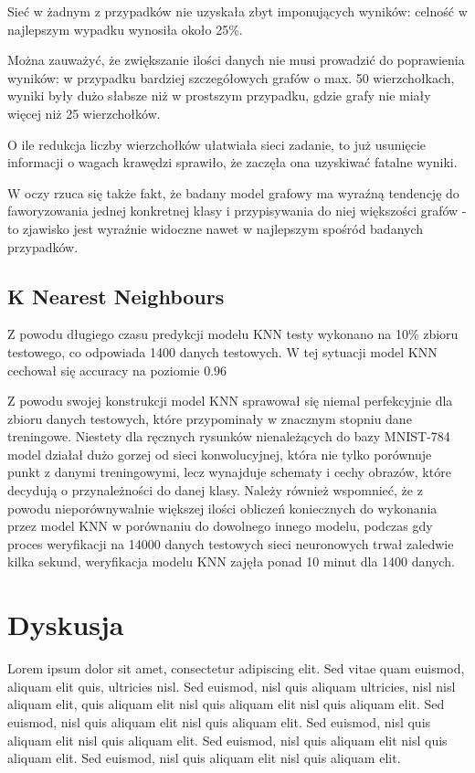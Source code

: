 \documentclass{article}
\begin{document}
Sieć w żadnym z przypadków nie uzyskała zbyt imponujących 
wyników: celność w najlepszym wypadku wynosiła około 25\%. 

Można zauważyć, że zwiększanie ilości danych nie musi 
prowadzić do poprawienia wyników: w przypadku bardziej 
szczegółowych grafów o max. 50 wierzchołkach, wyniki były 
dużo słabsze niż w prostszym przypadku, gdzie grafy nie 
miały więcej niż 25 wierzchołków.

O ile redukcja liczby wierzchołków ułatwiała sieci zadanie, 
to już usunięcie informacji o wagach krawędzi sprawiło, 
że zaczęła ona uzyskiwać fatalne wyniki.

W oczy rzuca się także fakt, że badany model grafowy ma 
wyraźną tendencję do faworyzowania jednej konkretnej klasy 
i przypisywania do niej większości grafów - to zjawisko jest 
wyraźnie widoczne nawet w najlepszym spośród badanych przypadków.

\subsection{K Nearest Neighbours}

Z powodu długiego czasu predykcji modelu KNN testy wykonano na 10\% zbioru 
testowego, co odpowiada 1400 danych testowych.
W tej sytuacji model KNN cechował się accuracy na poziomie $0.96$


Z powodu swojej konstrukcji model KNN sprawował się niemal perfekcyjnie 
dla zbioru danych testowych, które przypominały w znacznym stopniu 
dane treningowe. Niestety dla ręcznych rysunków nienależących do 
bazy MNIST-784 model działał dużo gorzej od sieci konwolucyjnej, 
która nie tylko porównuje punkt z danymi treningowymi, lecz 
wynajduje schematy i cechy obrazów, które decydują o 
przynależności do danej klasy. Należy również wspomnieć, 
że z powodu nieporównywalnie większej ilości obliczeń 
koniecznych do wykonania przez model KNN w porównaniu 
do dowolnego innego modelu, podczas gdy proces weryfikacji 
na 14000 danych testowych sieci neuronowych trwał zaledwie 
kilka sekund, weryfikacja modelu KNN zajęła ponad 10 minut dla 1400 danych.

\section{Dyskusja}

Lorem ipsum dolor sit amet, consectetur adipiscing elit.
Sed vitae quam euismod, aliquam elit quis, ultricies nisl.
Sed euismod, nisl quis aliquam ultricies, nisl nisl aliquam elit,
quis aliquam elit nisl quis aliquam elit nisl quis aliquam elit.
Sed euismod, nisl quis aliquam elit nisl quis aliquam elit.
Sed euismod, nisl quis aliquam elit nisl quis aliquam elit.
Sed euismod, nisl quis aliquam elit nisl quis aliquam elit.
Sed euismod, nisl quis aliquam elit nisl quis aliquam elit.

\renewcommand{\refname}{Źródła}
\begin{thebibliography}{100}
\end{thebibliography}
\end{document}
